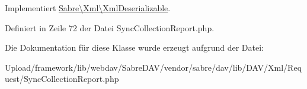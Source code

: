 Implementiert \mbox{\hyperlink{interface_sabre_1_1_xml_1_1_xml_deserializable_a19e0eca545b9a0d93f7d6b69085ade30}{Sabre\textbackslash{}\+Xml\textbackslash{}\+Xml\+Deserializable}}.



Definiert in Zeile 72 der Datei Sync\+Collection\+Report.\+php.



Die Dokumentation für diese Klasse wurde erzeugt aufgrund der Datei\+:\begin{DoxyCompactItemize}
\item 
Upload/framework/lib/webdav/\+Sabre\+D\+A\+V/vendor/sabre/dav/lib/\+D\+A\+V/\+Xml/\+Request/Sync\+Collection\+Report.\+php\end{DoxyCompactItemize}
